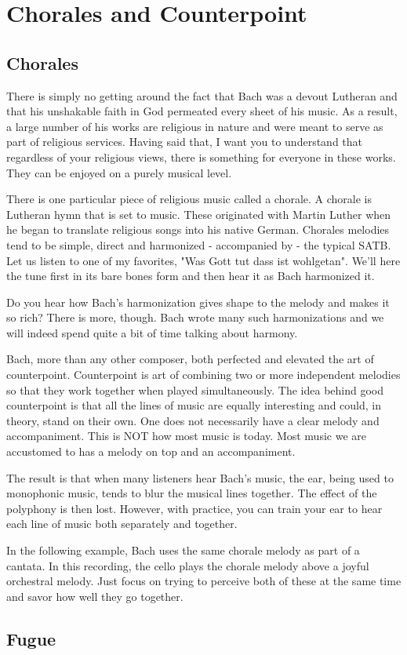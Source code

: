 \chapter{Chorales and Counterpoint}

\section{Chorales}
There is simply no getting around the fact that Bach was a devout Lutheran and that his unshakable faith in God permeated every sheet of his music. As a result, a large number of his works are religious in nature and were meant to serve as part of religious services. Having said that, I want you to understand that regardless of your religious views, there is something for everyone in these works. They can be enjoyed on a purely musical level. 

There is one particular piece of religious music called a chorale. A chorale is Lutheran hymn that is set to music. These originated with Martin Luther when he began to translate religious songs into his native German. Chorales melodies tend to be simple, direct and harmonized - accompanied by - the typical SATB. Let us listen to one of my favorites, "Was Gott tut dass ist wohlgetan". We'll here the tune first in its bare bones form and then hear it as Bach harmonized it.


Do you hear how Bach's harmonization gives shape to the melody and makes it so rich? There is more, though. Bach wrote many such harmonizations and we will indeed spend quite a bit of time talking about harmony. 

Bach, more than any other composer, both perfected and elevated the art of counterpoint. %
Counterpoint is art of combining two or more independent melodies so that they work together when played simultaneously. The idea behind good counterpoint is that all the lines of music are equally interesting and could, in theory, stand on their own. One does not necessarily have a clear melody and accompaniment. This is NOT how most music is today. Most music we are accustomed to has a melody on top and an accompaniment. %

The result is that when many listeners hear Bach's music, the ear, being used to monophonic music, tends to blur the musical lines together. The effect of the polyphony is then lost. However, with practice, you can train your ear to hear each line of music both separately and together.

In the following example, Bach uses the same chorale melody as part of a cantata. In this recording, the cello plays the chorale melody above a joyful orchestral melody. Just focus on trying to perceive both of these at the same time and savor how well they go together.


\section{Fugue}

